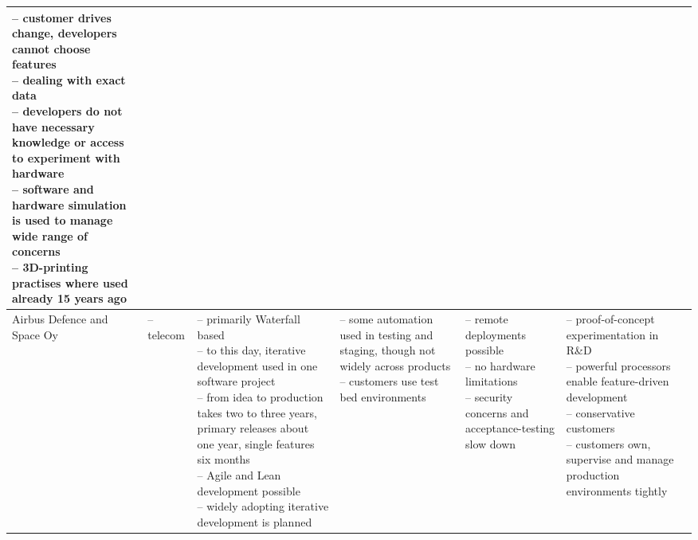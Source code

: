\documentclass[english]{tktltiki2}
\begin{document}
\begin{landscape}
\begin{longtable}{|p{2.5cm}|p{1.5cm}|p{4cm}|p{4cm}|p{4cm}|p{4cm}|}
{                        – customer drives change, developers cannot choose features \\
                        – dealing with exact data \\
                        – developers do not have necessary knowledge or access to experiment with hardware \\
                        – software and hardware simulation is used to manage wide range of concerns \\
                        – 3D-printing practises where used already 15 years ago} \\

        \hline

        Airbus Defence and Space Oy &
        – telecom &
        \parbox[t]{4cm}{– primarily Waterfall based \\
                        – to this day, iterative development used in one software project \\
                        – from idea to production takes two to three years, primary releases about one year, single features six months \\
                        – Agile and Lean development possible \\
                        – widely adopting iterative development is planned} &
        \parbox[t]{4cm}{– some automation used in testing and staging, though not widely across products \\
                        – customers use test bed environments} &
        \parbox[t]{4cm}{– remote deployments possible \\
                        – no hardware limitations \\
                        – security concerns and acceptance-testing slow down} &
        \parbox[t]{4cm}{– proof-of-concept experimentation in R\&D \\
                        – powerful processors enable feature-driven development \\
                        – conservative customers \\
                        – customers own, supervise and manage production environments tightly} \\

        \hline


\end{longtable}
\end{landscape}
\end{document}
